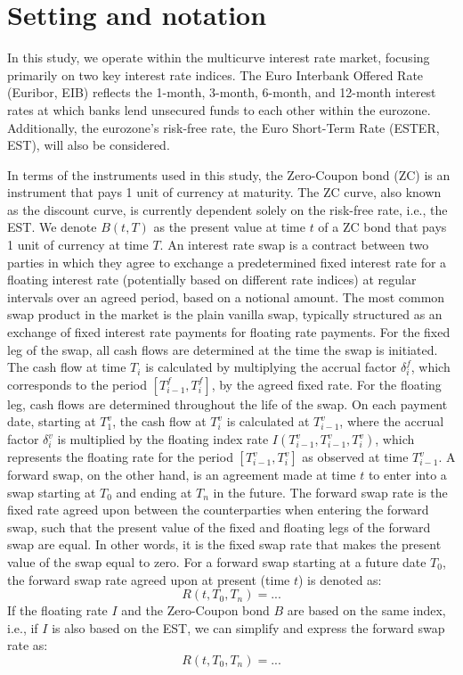 \chapter{Setting and notation}
In this study, we operate within the multicurve interest rate market, focusing primarily on two key interest rate indices. 
The Euro Interbank Offered Rate (Euribor, EIB) reflects the 1-month, 3-month, 6-month, and 12-month interest rates at which 
banks lend unsecured funds to each other within the eurozone. Additionally, the eurozone's risk-free rate, the 
Euro Short-Term Rate (ESTER, EST), will also be considered.

In terms of the instruments used in this study, the Zero-Coupon bond (ZC) is an instrument that pays 1 unit of currency 
at maturity. The ZC curve, also known as the discount curve, is currently dependent solely on the risk-free rate, 
i.e., the EST. We denote \( B(t,T) \) as the present value at time \( t \) of a ZC bond that pays 1 unit of currency 
at time \( T \).
An interest rate swap is a contract between two parties in which they agree to exchange a predetermined fixed interest rate for a floating 
interest rate (potentially based on different rate indices) at regular intervals over an agreed period, based on a notional amount. 
The most common swap product in the market is the plain vanilla swap, typically structured as an exchange of fixed interest rate payments for 
floating rate payments.
For the fixed leg of the swap, all cash flows are determined at the time the swap is initiated. The cash flow at time \(T_i\) is calculated 
by multiplying the accrual factor \(\delta_{i}^{f}\), which corresponds to the period \([T_{i-1}^{f}, T_{i}^{f}]\), by the agreed fixed rate.
For the floating leg, cash flows are determined throughout the life of the swap. On each payment date, starting at \(T_{1}^{v}\), the cash flow 
at \(T_i^{v}\) is calculated at \(T_{i-1}^{v}\), where the accrual factor \(\delta_{i}^{v}\) is multiplied by the floating index rate 
\(I(T_{i-1}^{v}, T_{i-1}^{v}, T_{i}^{v})\), which represents the floating rate for the period \([T_{i-1}^{v}, T_{i}^{v}]\) as observed at 
time \(T_{i-1}^{v}\).
A forward swap, on the other hand, is an agreement made at time \(t\) to enter into a swap starting at \(T_0\) and ending at \(T_n\) in the 
future. The forward swap rate is the fixed rate agreed upon between the counterparties when entering the forward swap, 
such that the present value of the fixed and floating legs of the forward swap are equal. In other words, it is the fixed swap rate that makes 
the present value of the swap equal to zero. For a forward swap starting at a future date \(T_0\), the forward swap rate agreed upon at present 
(time \(t\)) is denoted as:
$$
R(t, T_{0}, T_{n}) = ...
$$
If the floating rate \(I\) and the Zero-Coupon bond \(B\) are based on the same index, i.e., if \(I\) is also based on the EST, 
we can simplify and express the forward swap rate as:
$$
R(t, T_{0}, T_{n}) = ...
$$

